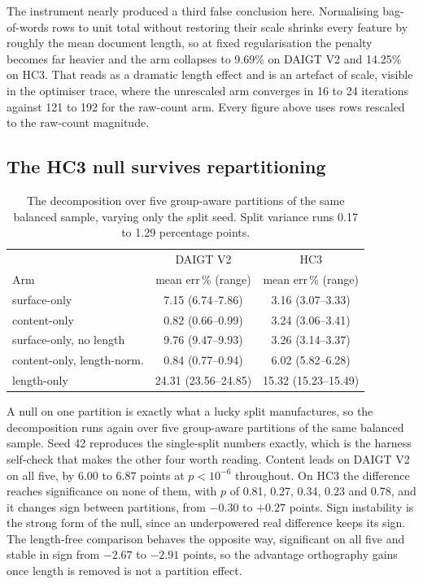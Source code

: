 \documentclass[conference,a4paper]{IEEEtran}
\begin{document}
The instrument nearly produced a third false conclusion here. Normalising bag-of-words rows to unit total without restoring their scale shrinks every feature by roughly the mean document length, so at fixed regularisation the penalty becomes far heavier and the arm collapses to 9.69\% on DAIGT V2 and 14.25\% on HC3. That reads as a dramatic length effect and is an artefact of scale, visible in the optimiser trace, where the unrescaled arm converges in 16 to 24 iterations against 121 to 192 for the raw-count arm. Every figure above uses rows rescaled to the raw-count magnitude.

\FloatBarrier
\subsection{The HC3 null survives repartitioning}
\label{sec:multisplit}

\begin{table}[!ht]
\centering
\caption{The decomposition over five group-aware partitions of the same balanced sample, varying only the split seed. Split variance runs 0.17 to 1.29 percentage points.}
\label{tab:multisplit}
\footnotesize
\setlength{\tabcolsep}{3.5pt}
\begin{tabular}{@{}lcc@{}}
\toprule
& DAIGT V2 & HC3 \\
Arm & mean err\,\% (range) & mean err\,\% (range) \\
\midrule
surface-only & 7.15 (6.74--7.86) & 3.16 (3.07--3.33) \\
content-only & 0.82 (0.66--0.99) & 3.24 (3.06--3.41) \\
surface-only, no length & 9.76 (9.47--9.93) & 3.26 (3.14--3.37) \\
content-only, length-norm. & 0.84 (0.77--0.94) & 6.02 (5.82--6.28) \\
length-only & 24.31 (23.56--24.85) & 15.32 (15.23--15.49) \\
\bottomrule
\end{tabular}
\end{table}

A null on one partition is exactly what a lucky split manufactures, so the decomposition runs again over five group-aware partitions of the same balanced sample. Seed 42 reproduces the single-split numbers exactly, which is the harness self-check that makes the other four worth reading. Content leads on DAIGT V2 on all five, by 6.00 to 6.87 points at $p < 10^{-6}$ throughout. On HC3 the difference reaches significance on none of them, with $p$ of 0.81, 0.27, 0.34, 0.23 and 0.78, and it changes sign between partitions, from $-0.30$ to $+0.27$ points. Sign instability is the strong form of the null, since an underpowered real difference keeps its sign. The length-free comparison behaves the opposite way, significant on all five and stable in sign from $-2.67$ to $-2.91$ points, so the advantage orthography gains once length is removed is not a partition effect.
\end{document}
